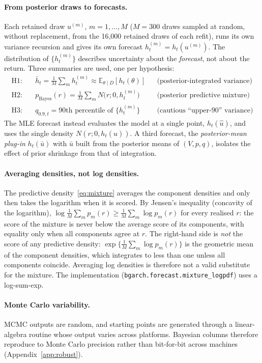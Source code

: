 \documentclass[11pt]{article}
\newcommand{\E}{\mathbb{E}}
\begin{document}
\paragraph{From posterior draws to forecasts.} Each retained draw $u^{(m)}$, $m=1,\dots,M$ ($M=300$ draws sampled at random, without replacement, from the 16{,}000 retained draws of each refit),
runs its own variance recursion and gives its own forecast $h_t^{(m)}=h_t(u^{(m)})$. The distribution of
$\{h_t^{(m)}\}$ describes uncertainty about the \emph{forecast}, not about the return. Three summaries are used,
one per hypothesis:
\begin{align}
\text{H1:}\quad&\bar h_t=\frac1M\sum_m h_t^{(m)}\approx\E_{\theta\mid D}[h_t(\theta)] &&\text{(posterior-integrated variance)}\\
\text{H2:}\quad&p_{\text{Bayes}}(r)=\frac1M\sum_m N\bigl(r;0,h_t^{(m)}\bigr) &&\text{(posterior predictive mixture)}\label{eq:mixture}\\
\text{H3:}\quad&q_{0.9,t}=\text{90th percentile of }\{h_t^{(m)}\} &&\text{(cautious ``upper-90'' variance)}
\end{align}
The MLE forecast instead evaluates the model at a single point, $h_t(\hat u)$, and uses the single density
$N(r;0,h_t(\hat u))$. A third forecast, the \emph{posterior-mean plug-in} $h_t(\bar u)$ with $\bar u$ built from the
posterior means of $(V,p,q)$, isolates the effect of prior shrinkage from that of integration.

\paragraph{Averaging densities, not log densities.} The predictive density~\eqref{eq:mixture} averages the component
densities and only then takes the logarithm when it is scored. By Jensen's inequality (concavity of the logarithm),
$\log\frac1M\sum_m p_m(r)\ge\frac1M\sum_m\log p_m(r)$ for every realised $r$: the score of the mixture is never below
the average score of its components, with equality only when all components agree at $r$. The right-hand side is
\emph{not} the score of any predictive density: $\exp\{\frac1M\sum_m\log p_m(r)\}$ is the geometric mean of the
component densities, which integrates to less than one unless all components coincide. Averaging log densities is
therefore not a valid substitute for the mixture. The implementation (\texttt{bgarch.forecast.mixture\_logpdf}) uses
a log-sum-exp.

\paragraph{Monte Carlo variability.} MCMC outputs are random, and starting points are generated through a
linear-algebra routine whose output varies across platforms. Bayesian columns therefore reproduce to Monte Carlo
precision rather than bit-for-bit across machines (Appendix~\ref{app:robust}).
\end{document}
